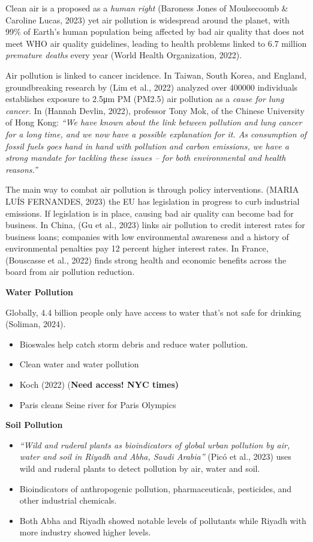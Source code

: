 \documentclass[
  letterpaper,
  DIV=11,
  numbers=noendperiod]{scrartcl}
\providecommand{\tightlist}{%
  \setlength{\itemsep}{0pt}\setlength{\parskip}{0pt}}\usepackage{longtable,booktabs,array}
\begin{document}
Clean air is a proposed as a \emph{human right} (Baroness Jones of
Moulsecoomb \& Caroline Lucas, 2023) yet air pollution is widespread
around the planet, with 99\% of Earth's human population being affected
by bad air quality that does not meet WHO air quality guidelines,
leading to health problems linked to 6.7 million \emph{premature deaths}
every year (World Health Organization, 2022).

Air pollution is linked to cancer incidence. In Taiwan, South Korea, and
England, groundbreaking research by (Lim et al., 2022) analyzed over
400000 individuals establishes exposure to 2.5μm PM (PM2.5) air
pollution as a \emph{cause for lung cancer.} In (Hannah Devlin, 2022),
professor Tony Mok, of the Chinese University of Hong Kong: \emph{``We
have known about the link between pollution and lung cancer for a long
time, and we now have a possible explanation for it. As consumption of
fossil fuels goes hand in hand with pollution and carbon emissions, we
have a strong mandate for tackling these issues -- for both
environmental and health reasons.''}

The main way to combat air pollution is through policy interventions.
(MARIA LUÍS FERNANDES, 2023) the EU has legislation in progress to curb
industrial emissions. If legislation is in place, causing bad air
quality can become bad for business. In China, (Gu et al., 2023) links
air pollution to credit interest rates for business loans; companies
with low environmental awareness and a history of environmental
penalties pay 12 percent higher interest rates. In France, (Bouscasse et
al., 2022) finds strong health and economic benefits across the board
from air pollution reduction.

\textbf{Water Pollution}

Globally, 4.4 billion people only have access to water that's not safe
for drinking (Soliman, 2024).

\begin{itemize}
\item
  Bioswales help catch storm debris and reduce water pollution.
\item
  Clean water and water pollution
\item
  Koch (2022) (\textbf{Need access! NYC times)}
\item
  Paris cleans Seine river for Paris Olympics
\end{itemize}

\textbf{Soil Pollution}

\begin{itemize}
\tightlist
\item
  \emph{``Wild and ruderal plants as bioindicators of global urban
  pollution by air, water and soil in Riyadh and Abha, Saudi Arabia''}
  (Picó et al., 2023) uses wild and ruderal plants to detect pollution
  by air, water and soil.
\item
  Bioindicators of anthropogenic pollution, pharmaceuticals, pesticides,
  and other industrial chemicals.
\item
  Both Abha and Riyadh showed notable levels of pollutants while Riyadh
  with more industry showed higher levels.
\end{itemize}
\end{document}
